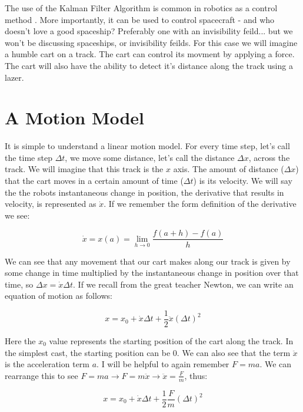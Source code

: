 \documentclass[11pt]{article}
\begin{document}
\maketitle

The use of the Kalman Filter Algorithm is common in robotics as a control
method \cite{probrobtics}. More importantly, it can be used to control spacecraft - and
who doesn't love a good spaceship? Preferably one with an invisibility feild... but
we won't be discussing spaceships, or invisibility feilds. For this case we will
imagine a humble cart on a track. The cart can control its movment by applying a force.
The cart will also have the ability to detect it's distance along the track using
a lazer.

\section{A Motion Model}

It is simple to understand a linear motion model. For every time step, let's call
the time step $\Delta t$, we move some distance, let's call the distance $\Delta x$,
across the track. We will imagine that this track is the $x$ axis. The amount of
distance ($\Delta x$) that the cart moves in a certain amount of time ($\Delta t$)
is its velocity. We will say the the robots instantaneous change in position, the
derivative that results in velocity, is represented as $\dot{x}$. If we remember the
form definition of the derivative \cite{calculus} we see:

\[
\dot{x} = x(a) = \lim_{h\to0} \frac{f(a + h) - f(a) }{h}
\]

We can see that any movement that our cart makes along our track is given by some
change in time multiplied by the instantaneous change in position over that time,
so $\Delta x =  \dot{x} \Delta t$. If we recall from the great teacher Newton, we can
write an equation of motion \cite{Principia} as follows:

\[
x = x_0 + \dot{x} \Delta t + \frac{1}{2} \ddot{x} (\Delta t)^2
\]

Here the $x_0$ value represents the starting position of the cart along the track.
In the simplest cast, the starting position can be $0$. We can also see that the
term $\ddot{x}$ is the acceleration term $a$. I will be helpful to again remember
$F= ma$. We can rearrange this to see $F = ma \rightarrow F = m \ddot{x} \rightarrow \ddot{x} = \frac{F}{m}$,
thus:

\[
x = x_0 + \dot{x} \Delta t + \frac{1}{2} \frac{F}{m} (\Delta t)^2
\]
\end{document}
